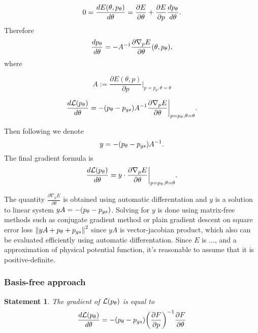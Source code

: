 \documentclass[a4paper,10pt]{report}
\newtheorem{statement}{Statement}
\begin{document}
\begin{equation}
0=\frac{dE(\theta, p_\theta)}{d \theta} = \frac{\partial E}{\partial \theta} + \frac{\partial E}{\partial p} \frac{dp_\theta}{d \theta}.
\end{equation}
Therefore
\begin{equation}
 \frac{dp_\theta}{d \theta} = -A^{-1} \frac{\partial \nabla_p E}{\partial \theta}(\theta, p_\theta),
\end{equation}
where

\begin{equation}
 A := \frac{\partial E(\theta, p)}{\partial p}\bigg|_{p=p_\theta, \theta=\theta}
\end{equation}


\begin{equation}
 \frac{d\mathcal{L}(p_\theta)}{d \theta} = - (p_\theta - p_{gs}) A^{-1}  \frac{\partial \nabla_p E}{\partial \theta}\bigg|_{p=p_\theta, \theta=\theta}.
\end{equation}


Then following \cite{neuralscf} we denote
\begin{equation}
 y = -(p_\theta-p_{gs})A^{-1}.
\end{equation}
The final gradient formula is
\begin{equation}
 \frac{d\mathcal{L}(p_\theta)}{d \theta} = y \cdot \frac{\partial \nabla_p E}{\partial \theta}\bigg|_{p=p_\theta, \theta=\theta}.
\end{equation}


The quantity $\frac{\partial \nabla_p E}{\partial \theta}$ is obtained using automatic differentation and $y$ is a solution to linear system $yA = -(p_\theta-p_{gs})$. Solving for $y$ is done using matrix-free methods such as conjugate gradient method or plain gradient descent on square error loss $\left\|yA + p_\theta+p_{gs}\right\|^2$ since $yA$ is vector-jacobian product, which also can be evaluated efficiently using automatic differentation. Since $E$ is ..., and a approximation of physical potential function, it's reasonable to assume that it is positive-definite.

\subsubsection{Basis-free approach}
\begin{statement}
The gradient of $\mathcal{L}(p_\theta)$ is equal to
 \begin{equation}
 \frac{d\mathcal{L}(p_\theta)}{d \theta} = -(p_\theta - p_{gs}) \bigg(\frac{\partial F}{\partial p}\bigg)^{-1}  \frac{\partial F}{\partial \theta}
\end{equation}
\end{statement}
\end{document}
